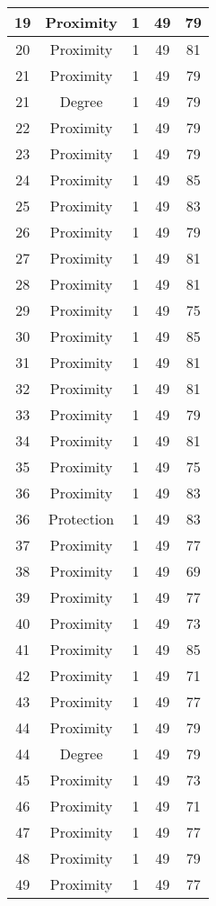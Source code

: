 \documentclass[results.tex]{subfiles}
\begin{document}
\begin{center}
\begin{tabular}{| c || c | c | c | c |}
    \hline
    19 & Proximity & 1 & 49 & 79 \\ 
    \hline
    20 & Proximity & 1 & 49 & 81 \\ 
    \hline
    21 & Proximity & 1 & 49 & 79 \\ 
    \hline
    21 & Degree & 1 & 49 & 79 \\ 
    \hline
    22 & Proximity & 1 & 49 & 79 \\ 
    \hline
    23 & Proximity & 1 & 49 & 79 \\ 
    \hline
    24 & Proximity & 1 & 49 & 85 \\ 
    \hline
    25 & Proximity & 1 & 49 & 83 \\ 
    \hline
    26 & Proximity & 1 & 49 & 79 \\ 
    \hline
    27 & Proximity & 1 & 49 & 81 \\ 
    \hline
    28 & Proximity & 1 & 49 & 81 \\ 
    \hline
    29 & Proximity & 1 & 49 & 75 \\ 
    \hline
    30 & Proximity & 1 & 49 & 85 \\ 
    \hline
    31 & Proximity & 1 & 49 & 81 \\ 
    \hline
    32 & Proximity & 1 & 49 & 81 \\ 
    \hline
    33 & Proximity & 1 & 49 & 79 \\ 
    \hline
    34 & Proximity & 1 & 49 & 81 \\ 
    \hline
    35 & Proximity & 1 & 49 & 75 \\ 
    \hline
    36 & Proximity & 1 & 49 & 83 \\ 
    \hline
    36 & Protection & 1 & 49 & 83 \\ 
    \hline
    37 & Proximity & 1 & 49 & 77 \\ 
    \hline
    38 & Proximity & 1 & 49 & 69 \\ 
    \hline
    39 & Proximity & 1 & 49 & 77 \\ 
    \hline
    40 & Proximity & 1 & 49 & 73 \\ 
    \hline
    41 & Proximity & 1 & 49 & 85 \\ 
    \hline
    42 & Proximity & 1 & 49 & 71 \\ 
    \hline
    43 & Proximity & 1 & 49 & 77 \\ 
    \hline
    44 & Proximity & 1 & 49 & 79 \\ 
    \hline
    44 & Degree & 1 & 49 & 79 \\ 
    \hline
    45 & Proximity & 1 & 49 & 73 \\ 
    \hline
    46 & Proximity & 1 & 49 & 71 \\ 
    \hline
    47 & Proximity & 1 & 49 & 77 \\ 
    \hline
    48 & Proximity & 1 & 49 & 79 \\ 
    \hline
    49 & Proximity & 1 & 49 & 77 \\ 
    \hline   \end{tabular}
\end{center}
\end{document}
